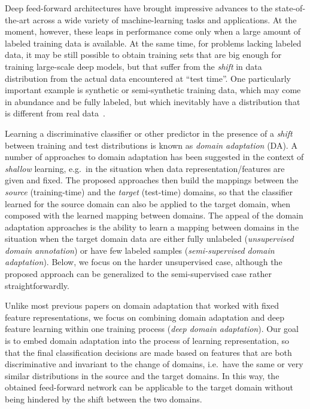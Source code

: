 \documentclass{article}
\begin{document}
Deep feed-forward architectures have brought impressive advances to the state-of-the-art across a wide variety of machine-learning tasks and applications. At the moment, however, these leaps in performance come only when a large amount of labeled training data is available. At the same time, for problems lacking labeled data, it may be still possible to obtain training sets that are big enough for training large-scale deep models, but that suffer from the {\em shift} in data distribution from the actual data encountered at ``test time''. One particularly important example is synthetic or semi-synthetic training data, which may come in abundance and be fully labeled, but which inevitably have a distribution that is different from real data~\cite{Liebelt10,Stark10,Vazquez14,Sun14}.








 



Learning a discriminative classifier or other predictor in the presence of a {\em shift} between training and test distributions is known as {\em domain adaptation} (DA). A number of approaches to domain adaptation has been suggested in the context of {\em shallow} learning, e.g.\ in the situation when data representation/features are given and fixed. The proposed approaches then build the mappings between the {\em source} (training-time) and the {\em target} (test-time) domains, so that the classifier learned for the source domain can also be applied to the target domain, when composed with the learned mapping between domains. The appeal of the domain adaptation approaches is the ability to learn a mapping between domains in the situation when the target domain data are either fully unlabeled ({\em unsupervised domain annotation}) or have few labeled samples ({\em semi-supervised domain adaptation}). Below, we focus on the harder unsupervised case, although the proposed approach can be generalized to the semi-supervised case rather straightforwardly.

Unlike most previous papers on domain adaptation that worked with fixed feature representations, we focus on combining domain adaptation and deep feature learning within one training process ({\em deep domain adaptation}). Our goal is to embed domain adaptation into the process of learning representation, so that the final classification decisions are made based on features that are both discriminative and invariant to the change of domains, i.e.\ have the same or very similar distributions in the source and the target domains. In this way, the obtained feed-forward network can be applicable to the target domain without being hindered by the shift between the two domains.
\end{document}
